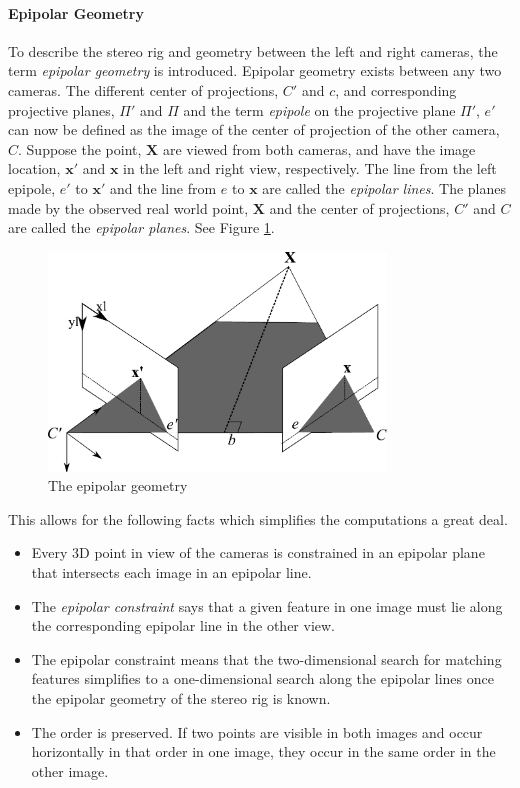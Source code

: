 \paragraph{Epipolar Geometry}
To describe the stereo rig and geometry between the left and right cameras, the term
\emph{epipolar geometry} is introduced. Epipolar geometry exists between any two cameras.
The different center of projections, $C'$ and $c$, and corresponding
projective planes, $\Pi'$ and $\Pi$ and the term \emph{epipole} on the projective plane
$\Pi'$, $e'$ can now be defined as the image of the center of projection of the other 
camera, $C$. Suppose the point, $\mathbf{X}$ are viewed from both cameras, and have the image
location, $\mathbf{x'}$ and $\mathbf{x}$ in the left and right view, respectively. The line from the left
epipole, $e'$ to $\mathbf{x'}$ and the line from $e$ to $\mathbf{x}$ are called the \emph{epipolar
lines}. The planes made by the observed real world point, $\mathbf{X}$ and the center of
projections, $C'$ and $C$ are called the \emph{epipolar planes}. See Figure
\ref{chap2:fig-epipolarGeometry}.
\begin{figure}[htbp]
    \centering
    \includegraphics[width=0.8\textwidth]{pics/epipolar}
    \caption{The epipolar geometry}
    \label{chap2:fig-epipolarGeometry}
\end{figure}

This allows for the following facts which simplifies the computations a great deal.
\cite{epipolar}
\begin{itemize}
    \item Every 3D point in view of the cameras is constrained in an epipolar plane that
        intersects each image in an epipolar line.
    \item The \emph{epipolar constraint} says that a given feature in one image must lie
        along the corresponding epipolar line in the other view.
    \item The epipolar constraint means that the two-dimensional search for matching
        features simplifies to a one-dimensional search along the epipolar lines once the
        epipolar geometry of the stereo rig is known.
    \item The order is preserved. If two points are visible in both images and occur
        horizontally in that order in one image, they occur in the same order in the other
        image.
\end{itemize}

